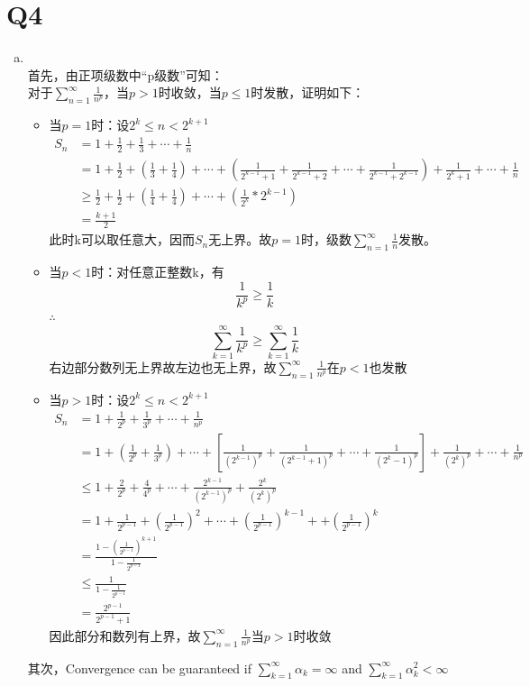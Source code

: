 \documentclass[a4paper, 11pt]{article}
\begin{document}
\section{Q4}
\begin{enumerate}[(a)]
\item
~\\
首先，由正项级数中“p级数”可知：\\
对于$\sum\limits _{n=1}^\infty \frac{1}{n^p}$，当$p>1$时收敛，当$p \leq 1$时发散，证明如下：\\
\begin{itemize}
  \item 当$p=1$时：设$2^k \leq n < 2^{k+1}$
  \begin{align*}
    S_n &= 1 + \frac{1}{2} + \frac{1}{3} + \cdots + \frac{1}{n} \\
    &= 1 + \frac{1}{2} + (\frac{1}{3} + \frac{1}{4}) + \cdots +
    (\frac{1}{2^{k-1}+1} + \frac{1}{2^{k-1}+2} + \cdots + \frac{1}{2^{k-1}+2^{k-1}})
    + \frac{1}{2^{k}+1} + \cdots + \frac{1}{n} \\
    &\ge \frac{1}{2} + \frac{1}{2} + (\frac{1}{4} + \frac{1}{4}) + \cdots + (\frac{1}{2^k} * 2^{k-1})  \\
    &= \frac{k+1}{2}
  \end{align*}
  此时k可以取任意大，因而$S_n$无上界。故$p=1$时，级数$\sum\limits _{n=1}^\infty \frac{1}{n}$发散。
  \item 当$p<1$时：对任意正整数k，有
  $$\frac{1}{k^p} \ge \frac{1}{k}$$
  $\therefore$
  $$\sum\limits _{k=1}^\infty \frac{1}{k^p} \ge \sum\limits _{k=1}^\infty \frac{1}{k}$$
  右边部分数列无上界故左边也无上界，故$\sum\limits _{n=1}^\infty \frac{1}{n^p}$在$p<1$也发散
  \item 当$p>1$时：设$2^k \leq n < 2^{k+1}$
  \begin{align*}
    S_n &= 1 + \frac{1}{2^p} + \frac{1}{3^p} + \cdots + \frac{1}{n^p} \\
    &= 1 + (\frac{1}{2^p} + \frac{1}{3^p})  + \cdots +
    [\frac{1}{(2^{k-1})^p} + \frac{1}{(2^{k-1}+1)^p} + \cdots + \frac{1}{(2^{k}-1)^p}]
    + \frac{1}{(2^k)^p}  + \cdots + \frac{1}{n^p} \\
    &\leq 1 + \frac{2}{2^p} + \frac{4}{4^p} + \cdots + \frac{2^{k-1}}{(2^{k-1})^p} + \frac{2^k}{(2^k)^p} \\
    &= 1 + \frac{1}{2^{p-1}} + (\frac{1}{2^{p-1}})^2 + \cdots + (\frac{1}{2^{p-1}})^{k-1} + + (\frac{1}{2^{p-1}})^{k} \\
    &= \frac{1-(\frac{1}{2^{p-1}})^{k+1}}{1-\frac{1}{2^{p-1}}} \\
    &\leq \frac{1}{1-\frac{1}{2^{p-1}}} \\
    &= \frac{2^{p-1}}{2^{p-1}+1}
  \end{align*}
  因此部分和数列有上界，故$\sum\limits _{n=1}^\infty \frac{1}{n^p}$当$p>1$时收敛
\end{itemize}
其次，Convergence can be guaranteed if $\sum\limits _{k=1}^\infty \alpha_k = \infty$ and $\sum\limits_{k=1}^\infty \alpha_k^2 < \infty$\\


\end{enumerate}
\end{document}
